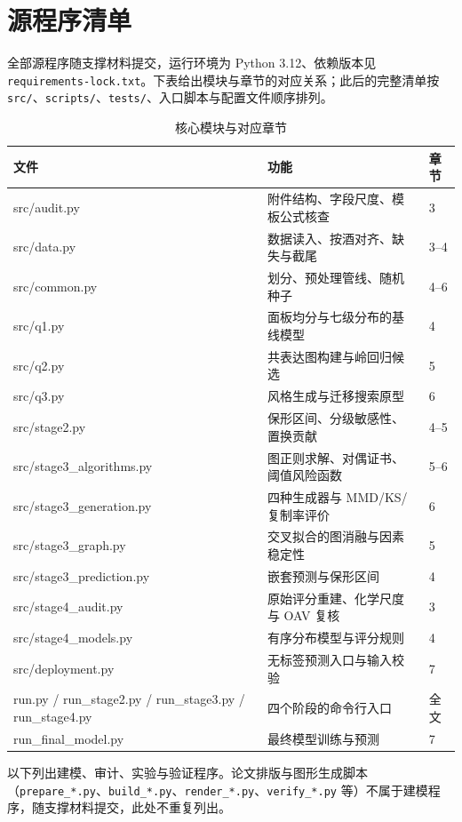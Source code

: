 \section{源程序清单}
\label{app:code}

全部源程序随支撑材料提交，运行环境为 Python 3.12、依赖版本见 \texttt{requirements-lock.txt}。下表给出模块与章节的对应关系；此后的完整清单按 \texttt{src/}、\texttt{scripts/}、\texttt{tests/}、入口脚本与配置文件顺序排列。

\begin{table}[h]
\centering\footnotesize\renewcommand{\arraystretch}{1.1}
\caption{核心模块与对应章节}
\begin{tabular}{L{0.42\columnwidth}L{0.30\columnwidth}L{0.18\columnwidth}}
\toprule
文件 & 功能 & 章节 \\
\midrule
src/audit.py & 附件结构、字段尺度、模板公式核查 & 3 \\
src/data.py & 数据读入、按酒对齐、缺失与截尾 & 3--4 \\
src/common.py & 划分、预处理管线、随机种子 & 4--6 \\
src/q1.py & 面板均分与七级分布的基线模型 & 4 \\
src/q2.py & 共表达图构建与岭回归候选 & 5 \\
src/q3.py & 风格生成与迁移搜索原型 & 6 \\
src/stage2.py & 保形区间、分级敏感性、置换贡献 & 4--5 \\
src/stage3\_algorithms.py & 图正则求解、对偶证书、阈值风险函数 & 5--6 \\
src/stage3\_generation.py & 四种生成器与 MMD/KS/复制率评价 & 6 \\
src/stage3\_graph.py & 交叉拟合的图消融与因素稳定性 & 5 \\
src/stage3\_prediction.py & 嵌套预测与保形区间 & 4 \\
src/stage4\_audit.py & 原始评分重建、化学尺度与 OAV 复核 & 3 \\
src/stage4\_models.py & 有序分布模型与评分规则 & 4 \\
src/deployment.py & 无标签预测入口与输入校验 & 7 \\
run.py / run\_stage2.py / run\_stage3.py / run\_stage4.py & 四个阶段的命令行入口 & 全文 \\
run\_final\_model.py & 最终模型训练与预测 & 7 \\
\bottomrule
\end{tabular}
\end{table}

\begingroup\scriptsize
以下列出建模、审计、实验与验证程序。论文排版与图形生成脚本（\texttt{prepare\_*.py}、\texttt{build\_*.py}、\texttt{render\_*.py}、\texttt{verify\_*.py} 等）不属于建模程序，随支撑材料提交，此处不重复列出。
